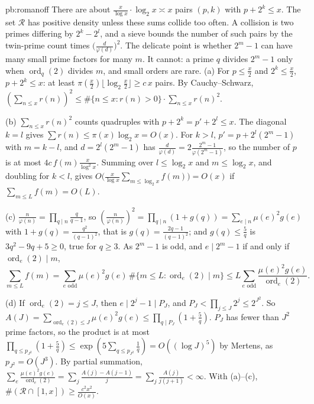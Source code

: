 \begin{solution}{pb:romanoff}
\idea There are about $\frac x{\log x}\cdot\log_2 x\asymp x$ pairs $(p,k)$ with $p+2^k\le x$. The set $\mathcal R$ has positive density unless these sums collide too often. A collision is two primes differing by $2^k-2^l$, and a sieve bounds the number of such pairs by the twin-prime count times $\bigl(\frac d{\varphi(d)}\bigr)^2$. The delicate point is whether $2^m-1$ can have many small prime factors for many $m$. It cannot: a prime $q$ divides $2^m-1$ only when $\operatorname{ord}_q(2)$ divides $m$, and small orders are rare.
\writeup (a) For $p\le\frac x2$ and $2^k\le\frac x2$, $p+2^k\le x$: at least $\pi(\frac x2)\lfloor\log_2\frac x2\rfloor\ge c\,x$ pairs. By Cauchy--Schwarz,
$(\sum_{n\le x}r(n))^2\le\#\{n\le x:r(n)>0\}\cdot\sum_{n\le x}r(n)^2$.

(b) $\sum_{n\le x}r(n)^2$ counts quadruples with $p+2^k=p'+2^l\le x$. The diagonal $k=l$ gives $\sum r(n)\le\pi(x)\log_2x=O(x)$. For $k>l$, $p'=p+2^l(2^m-1)$ with $m=k-l$, and
$d=2^l(2^m-1)$ has $\frac d{\varphi(d)}=2\frac{2^m-1}{\varphi(2^m-1)}$, so the number of $p$ is at most $4c\,f(m)\frac x{\log^2x}$. Summing over $l\le\log_2x$ and $m\le\log_2x$, and
doubling for $k<l$, gives $O\bigl(\frac x{\log x}\sum_{m\le\log_2x}f(m)\bigr)=O(x)$ if $\sum_{m\le L}f(m)=O(L)$.

(c) $\frac n{\varphi(n)}=\prod_{q\mid n}\frac q{q-1}$, so $(\frac n{\varphi(n)})^2=\prod_{q\mid n}(1+g(q))=\sum_{e\mid n}\mu(e)^2g(e)$ with $1+g(q)=\frac{q^2}{(q-1)^2}$, that is
$g(q)=\frac{2q-1}{(q-1)^2}$; and $g(q)\le\frac5q$ is $3q^2-9q+5\ge0$, true for $q\ge3$. As $2^m-1$ is odd, and $e\mid2^m-1$ if and only if $\operatorname{ord}_e(2)\mid m$,
\[
\sum_{m\le L}f(m)=\sum_{e\text{ odd}}\mu(e)^2g(e)\,\#\{m\le L:\operatorname{ord}_e(2)\mid m\}\le L\sum_{e\text{ odd}}\frac{\mu(e)^2g(e)}{\operatorname{ord}_e(2)}.
\]

(d) If $\operatorname{ord}_e(2)=j\le J$, then $e\mid2^j-1\mid P_J$, and $P_J<\prod_{j\le J}2^j\le2^{J^2}$. So $A(J)=\sum_{\operatorname{ord}_e(2)\le J}\mu(e)^2g(e)\le\prod_{q\mid P_J}(1+\frac5q)$. $P_J$ has
fewer than $J^2$ prime factors, so the product is at most $\prod_{q\le p_{J^2}}(1+\frac5q)\le\exp(5\sum_{q\le p_{J^2}}\frac1q)=O((\log J)^5)$ by Mertens, as $p_{J^2}=O(J^3)$. By partial summation,
$\sum_e\frac{\mu(e)^2g(e)}{\operatorname{ord}_e(2)}=\sum_j\frac{A(j)-A(j-1)}j=\sum_j\frac{A(j)}{j(j+1)}<\infty$. With (a)--(c), $\#(\mathcal R\cap[1,x])\ge\frac{c^2x^2}{O(x)}$.


\end{solution}
